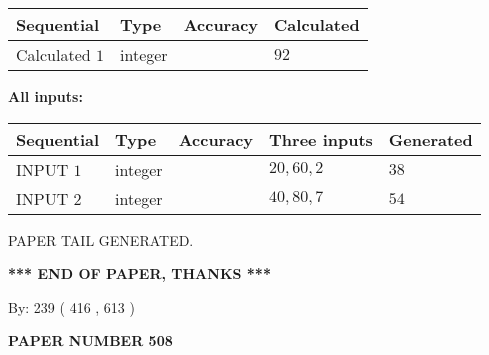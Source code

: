 \documentclass[12pt]{article}
\begin{document}
   
   
   
\noindent{}
   
   
  
  
\noindent\begin{tabular}{|l|l|l|l|}
\hline
 Sequential & Type & Accuracy & Calculated \\ 
\hline
 
 
  Calculated $  1 $ & integer &  & 
  $ 92 $ 
 \\  \hline  
 \end{tabular}
   
   
   
   
\noindent\vspace{0.1in}\hspace{-0.08in} {\textbf{\Large{All inputs: }}}
   
   
  
  
\noindent\begin{tabular}{|l|l|l|l|l|}
\hline
 Sequential & Type & Accuracy & Three inputs & Generated \\ 
\hline
 
 
  INPUT $  1 $ & integer &  & $
 20
 , 
 60
 , 
 2
 $ & $ 38 $ 
 \\  \hline  
 
 
  INPUT $  2 $ & integer &  & $
 40
 , 
 80
 , 
 7
 $ & $ 54 $ 
 \\  \hline  
 \end{tabular}
   
   
   
   
   
   
 \vspace{0.2in}
 
   
   
\vspace{2.0in} PAPER TAIL GENERATED.
   
   
   
   
\vspace{1.0in} 
{\textbf{\large{ *** END OF PAPER, THANKS *** }}} 
   
   
\hspace{1.0in} By: 
 239 ( 416 ,  613 )
   
   
   
   
\newpage 
\setcounter{page}{ 
   508001 } 
   
   
   
   
 {\textbf{ \Large{ PAPER NUMBER  508  }}}
   
\end{document}

